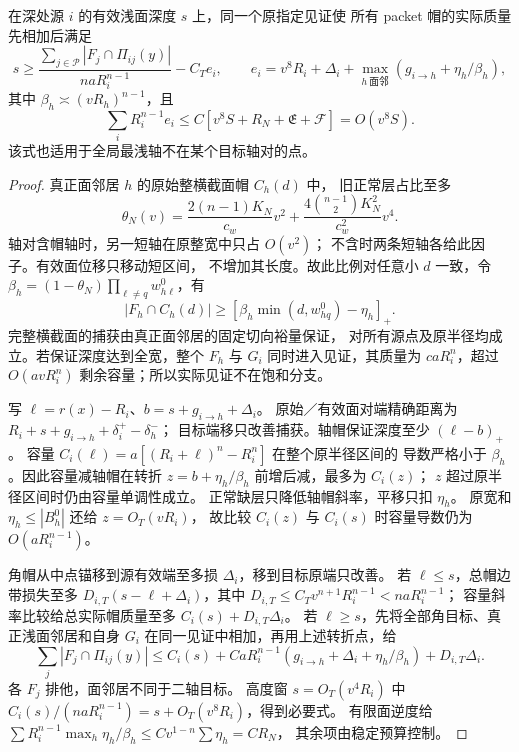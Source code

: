 \begin{lemma}\label{eighth:exact-axial}
在深处源 \(i\) 的有效浅面深度 \(s\) 上，同一个原指定见证使
所有 packet 帽的实际质量先相加后满足
\begin{equation}\label{eighth:exact-height-nec}
 s\ge\frac{\sum_{j\in\mathscr P}|F_j\cap\Pi_{ij}(y)|}
                  {naR_i^{n-1}}-C_Te_i,
 \qquad
 e_i=v^8R_i+\Delta_i+
          \max_{h\ \text{面邻}}(g_{i\to h}+\eta_h/\beta_h),
\end{equation}
其中 \(\beta_h\asymp(vR_h)^{n-1}\)，且
\[
 \sum_iR_i^{n-1}e_i
 \le C[v^8S+R_N+\mathfrak E+\mathcal F]=O(v^8S).
\]
该式也适用于全局最浅轴不在某个目标轴对的点。
\end{lemma}
\begin{proof}
真正面邻居 \(h\) 的原始整横截面帽 \(C_h(d)\) 中，
旧正常层占比至多
\[
 \theta_N(v)=\frac{2(n-1)K_N}{c_w}v^2+
        \frac{4\binom{n-1}{2}K_N^2}{c_w^2}v^4.
\]
轴对含帽轴时，另一短轴在原整宽中只占 \(O(v^2)\)；
不含时两条短轴各给此因子。有效面位移只移动短区间，
不增加其长度。故此比例对任意小 \(d\) 一致，令
\(\beta_h=(1-\theta_N)\prod_{\ell\ne q}w^0_{h\ell}\)，有
\[
 |F_h\cap C_h(d)|\ge
 [\beta_h\min(d,w^0_{hq})-\eta_h]_+.
\]
完整横截面的捕获由真正面邻居的固定切向裕量保证，
对所有源点及原半径均成立。若保证深度达到全宽，整个 \(F_h\)
与 \(G_i\) 同时进入见证，其质量为 \(caR_i^n\)，超过
\(O(avR_i^n)\) 剩余容量；所以实际见证不在饱和分支。

写 \(\ell=r(x)-R_i\)、\(b=s+g_{i\to h}+\Delta_i\)。
原始／有效面对端精确距离为
\(R_i+s+g_{i\to h}+\delta_i^+-\delta_h^-\)；
目标端移只改善捕获。轴帽保证深度至少 \((\ell-b)_+\)。
容量 \(C_i(\ell)=a[(R_i+\ell)^n-R_i^n]\) 在整个原半径区间的
导数严格小于 \(\beta_h\)。因此容量减轴帽在转折
\(z=b+\eta_h/\beta_h\) 前增后减，最多为 \(C_i(z)\)；
\(z\) 超过原半径区间时仍由容量单调性成立。
正常缺层只降低轴帽斜率，平移只扣 \(\eta_h\)。
原宽和 \(\eta_h\le|B_h^0|\) 还给 \(z=O_T(vR_i)\)，
故比较 \(C_i(z)\) 与 \(C_i(s)\) 时容量导数仍为 \(O(aR_i^{n-1})\)。

角帽从中点锚移到源有效端至多损 \(\Delta_i\)，移到目标原端只改善。
若 \(\ell\le s\)，总帽边带损失至多
\(D_{i,T}(s-\ell+\Delta_i)\)，其中
\(D_{i,T}\le C_Tv^{n+1}R_i^{n-1}<naR_i^{n-1}\)；
容量斜率比较给总实际帽质量至多 \(C_i(s)+D_{i,T}\Delta_i\)。
若 \(\ell\ge s\)，先将全部角目标、真正浅面邻居和自身 \(G_i\)
在同一见证中相加，再用上述转折点，给
\[
 \sum_j|F_j\cap\Pi_{ij}(y)|
 \le C_i(s)+CaR_i^{n-1}(g_{i\to h}+\Delta_i+\eta_h/\beta_h)
                    +D_{i,T}\Delta_i.
\]
各 \(F_j\) 排他，面邻居不同于二轴目标。
高度窗 \(s=O_T(v^4R_i)\) 中
\(C_i(s)/(naR_i^{n-1})=s+O_T(v^8R_i)\)，得到必要式。
有限面逆度给
\(\sum R_i^{n-1}\max_h\eta_h/\beta_h\le Cv^{1-n}\sum\eta_h=CR_N\)，
其余项由稳定预算控制。
\end{proof}

